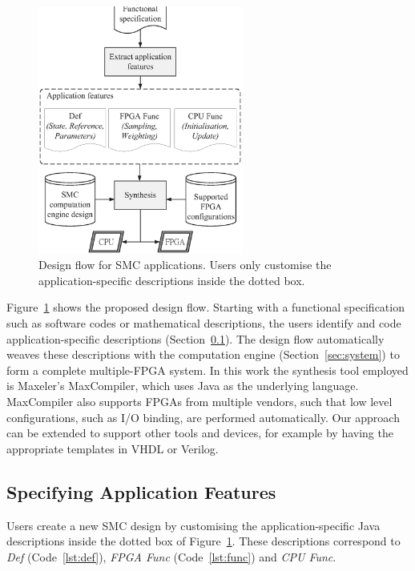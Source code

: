 \begin{figure}[h]
\begin{center}
\includegraphics[width=0.6\textwidth]{design_flow/figures/flow}
\end{center}
\caption{Design flow for SMC applications. Users only customise the application-specific descriptions inside the dotted box.}
\label{fig:flow}
\end{figure}

Figure~\ref{fig:flow} shows the proposed design flow.
Starting with a functional specification such as software codes or mathematical descriptions, 
the users identify and code application-specific descriptions (Section~\ref{sec:kernel}). The design flow automatically weaves these descriptions with the computation engine (Section~\ref{sec:system}) to form a complete multiple-FPGA system.
In this work the synthesis tool employed is Maxeler's MaxCompiler, which uses Java as the underlying language. 
MaxCompiler also supports FPGAs from multiple vendors, such that low level configurations, such as I/O binding, are performed automatically.
Our approach can be extended to support other tools and devices, for example by having the appropriate templates in VHDL or Verilog.

\subsection{Specifying Application Features}
\label{sec:kernel}

Users create a new SMC design by customising the application-specific Java descriptions inside the dotted box of Figure~\ref{fig:flow}.
These descriptions correspond to \textit{Def} (Code~\ref{lst:def}), \textit{FPGA Func} (Code~\ref{lst:func}) and \textit{CPU Func}.

